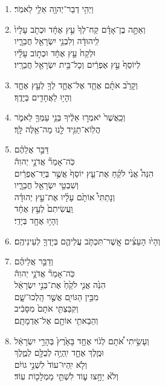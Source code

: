 \documentclass[12pt,a4paper,titlepage]{article}
\def \pscolor{red} %
\def \pslabelsep{-0.75em} %
\def \psleftmargin{0em} %
\begin{document}
\begin{hebrew}
\begin{enumerate}[leftmargin=\psleftmargin, labelsep=\pslabelsep, label=\fontspec{Linux Libertine}\arabic*, font=\color{\pscolor}\small\textsuperscript, parsep=0em, itemsep=0em, topsep=0em]
                  \subsection*{}
                  \vspace{-0.6mm}
            \item וַיְהִ֥י דְבַר־יְהוָ֖ה אֵלַ֥י לֵאמֹֽר׃
            \item וְאַתָּ֣ה בֶן־אָדָ֗ם קַח־לְךָ֙ עֵ֣ץ אֶחָ֔ד וּכְתֹ֤ב עָלָיו֙ \\ לִֽיהוּדָ֔ה וְלִבְנֵ֥י יִשְׂרָאֵ֖ל חֲבֵרָ֑יו \\ וּלְקַח֙ עֵ֣ץ אֶחָ֔ד וּכְת֣וֹב עָלָ֗יו \\ לְיוֹסֵף֙ עֵ֣ץ אֶפְרַ֔יִם וְכָל־בֵּ֥ית יִשְׂרָאֵ֖ל חֲבֵרָֽיו׃
            \item וְקָרַ֙ב אֹתָ֜ם אֶחָ֧ד אֶל־אֶחָ֛ד לְךָ֖ לְעֵ֣ץ אֶחָ֑ד \\ וְהָי֥וּ לַאֲחָדִ֖ים בְּיָדֶֽךָ׃
            \item וְכַֽאֲשֶׁר֙ יֹאמְר֣וּ אֵלֶ֔יךָ בְּנֵ֥י עַמְּךָ֖ לֵאמֹ֑ר \\ הֲלֽוֹא־תַגִּ֥יד לָ֖נוּ מָה־אֵ֥לֶּה לָּֽךְ׃
            \item דַּבֵּ֣ר אֲלֵהֶ֗ם \\ כֹּֽה־אָמַר֘ אֲדֹנָ֣י יְהוִה֒ \\ הִנֵּה֩ אֲנִ֙י לֹקֵ֜חַ אֶת־עֵ֤ץ יוֹסֵף֙ אֲשֶׁ֣ר בְּיַד־אֶפְרַ֔יִם \\ וְשִׁבְטֵ֥י יִשְׂרָאֵ֖ל חֲבֵרָ֑יו \\ וְנָתַתִּי֩ אוֹתָ֙ם עָלָ֜יו אֶת־עֵ֣ץ יְהוּדָ֗ה \\ וַֽעֲשִׂיתִם֙ לְעֵ֣ץ אֶחָ֔ד \\ וְהָי֥וּ אֶחָ֖ד בְּיָדִֽי׃
            \item וְהָי֙וּ הָעֵצִ֜ים אֲֽשֶׁר־תִּכְתֹּ֧ב עֲלֵיהֶ֛ם בְּיָדְךָ֖ לְעֵינֵיהֶֽם׃
            \item וְדַבֵּ֣ר אֲלֵיהֶ֗ם \\ כֹּֽה־אָמַר֘ אֲדֹנָ֣י יְהוִה֒ \\ הִנֵּ֙ה אֲנִ֤י לֹקֵ֙חַ֙ אֶת־בְּנֵ֣י יִשְׂרָאֵ֔ל \\ מִבֵּ֥ין הַגּוֹיִ֖ם אֲשֶׁ֣ר הָֽלְכוּ־שָׁ֑ם \\ וְקִבַּצְתִּ֤י אֹתָם֙ מִסָּבִ֔יב \\ וְהֵבֵאתִ֥י אוֹתָ֖ם אֶל־אַדְמָתָֽם׃
            \item וְעָשִׂ֣יתִי אֹ֠תָם לְג֙וֹי אֶחָ֤ד בָּאָ֙רֶץ֙ בְּהָרֵ֣י יִשְׂרָאֵ֔ל \\ וּמֶ֧לֶךְ אֶחָ֛ד יִֽהְיֶ֥ה לְכֻלָּ֖ם לְמֶ֑לֶךְ \\ וְלֹ֤א יִֽהְיוּ־עוֹד֙ לִשְׁנֵ֣י גוֹיִ֔ם \\ וְלֹ֙א יֵחָ֥צוּ ע֛וֹד לִשְׁתֵּ֥י מַמְלָכ֖וֹת עֽוֹד׃

\end{enumerate}
\end{hebrew}
\end{document}
